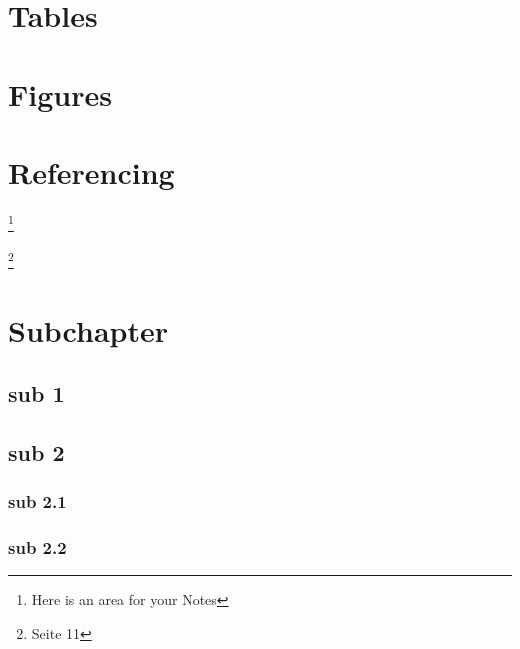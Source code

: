\documentclass[a4paper, 12pt, oneside, BCOR1cm,toc=chapterentrywithdots]{scrbook}
\begin{document}
\chapter{Tables}

\chapter{Figures}

\chapter{Referencing}

\blindtext \cite{autorenrichtlinien}

\blindtext \footnote{Here is an area for your Notes}

\blindtext \footnote{\cite{lnilatex} Seite 11}
\blindtext \cite{lnilatex}
\blindtext \cite{autorenrichtlinien,pepper1992grundlagen,chen2001audiovisual}


\chapter{Subchapter}

\section{sub 1}
\blindtext[3]
\section{sub 2}
\blindtext[3]
\subsection{sub 2.1}
\blindtext[3]

\subsection{sub 2.2}
\blindtext[3]





\printindex
\end{document}
